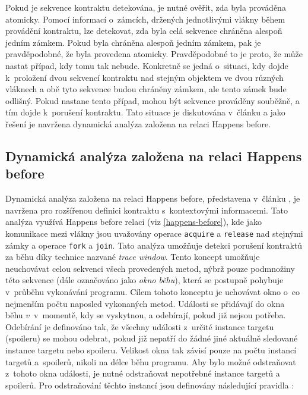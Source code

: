 Pokud je sekvence kontraktu detekována, je nutné ověřit, zda byla prováděna atomicky. Pomocí informací o~zámcích, držených jednotlivými vlákny během provádění kontraktu, lze detekovat, zda byla celá sekvence chráněna alespoň jedním zámkem. Pokud byla chráněna alespoň jedním zámkem, pak je pravděpodobné, že byla provedena atomicky. Pravděpodobné to je proto, že může nastat případ, kdy tomu tak nebude. Konkretně se jedná o~situaci, kdy dojde k~proložení dvou sekvencí kontraktu nad stejným objektem ve dvou různých vláknech a obě tyto sekvence budou chráněny zámkem, ale tento zámek bude odlišný. Pokud nastane tento případ, mohou být sekvence prováděny souběžně, a tím dojde k~porušení kontraktu. Tato situace je diskutována v~článku \cite{cite:contract1} a jako řešení je navržena dynamická analýza založena na relaci Happens before.


\subsection{Dynamická analýza založena na relaci Happens before}\label{contract-hb}

Dynamická analýza založena na relaci Happens before, představena v~článku \cite{cite:contract2}, je navržena pro rozšířenou definici kontraktu s~kontextovými informacemi. Tato analýza využívá Happens before relaci (viz \ref{happens-before}), kde jako komunikace mezi vlákny jsou uvažovány operace \texttt{acquire} a \texttt{release} nad stejnými zámky a operace \texttt{fork} a \texttt{join}. Tato analýza umožňuje detekci porušení kontraktů za běhu díky technice nazvané \textit{trace window}. Tento koncept umožňuje neuchovávat celou sekvenci všech provedených metod, nýbrž pouze podmnožiny této sekvence (dále označováno jako \textit{okno běhu}), která se postupně pohybuje v~průběhu vykonávání programu. Cílem tohoto konceptu je uchovávat okno o~co nejmenším počtu naposled vykonaných metod.
Události se přidávají do okna běhu $v$~v~momentě, kdy se vyskytnou, a odebírají, pokud již nejsou potřeba. Odebírání je definováno tak, že všechny události z~určité instance targetu (spoileru) se mohou odebrat, pokud již nepatří do žádné jiné aktuálně sledované instance targetu nebo spoileru. Velikost okna tak závisí pouze na počtu instancí targetů a~spoilerů, nikoli na délce běhu programu. Aby bylo možné odstraňovat z~tohoto okna události, je nutné odstraňovat nepotřebné instance targetů a spoilerů. Pro odstraňování těchto instancí jsou definovány následující pravidla \cite{cite:contract2}: 

